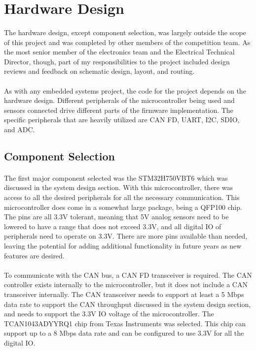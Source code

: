 \section{Hardware Design}

\paragraph{}
The hardware design, except component selection, was largely outside the scope of this project and was completed by other members of the competition team.
As the most senior member of the electronics team and the Electrical Technical Director, though, part of my responsibilities to the project included design reviews and feedback on schematic design, layout, and routing.

\paragraph{}
As with any embedded systems project, the code for the project depends on the hardware design.
Different peripherals of the microcontroller being used and sensors connected drive different parts of the firmware implementation.
The specific peripherals that are heavily utilized are CAN FD, UART, I2C, SDIO, and ADC.

\subsection{Component Selection}

\paragraph{}
The first major component selected was the STM32H750VBT6 which was discussed in the system design section.
With this microcontroller, there was access to all the desired peripherals for all the necessary communication.
This microcontroller does come in a somewhat large package, being a QFP100 chip.
The pins are all 3.3V tolerant, meaning that 5V analog sensors need to be lowered to have a range that does not exceed 3.3V, and all digital IO of peripherals need to operate on 3.3V.
There are more pins available than needed, leaving the potential for adding additional functionality in future years as new features are desired.

\paragraph{}
To communicate with the CAN bus, a CAN FD transceiver is required.
The CAN controller exists internally to the microcontroller, but it does not include a CAN transceiver internally.
The CAN transceiver needs to support at least a 5 Mbps data rate to support the CAN throughput discussed in the system design section, and needs to support the 3.3V IO voltage of the microcontroller.
The TCAN1043ADYYRQ1 chip from Texas Instruments \cite{CANProductPage} was selected.
This chip can support up to a 8 Mbps data rate and can be configured to use 3.3V for all the digital IO.

